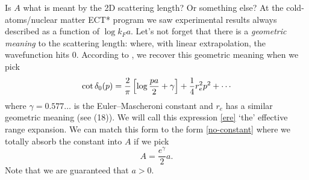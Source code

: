 Is $A$ what is meant by the 2D scattering length?  Or something else?
At the cold-atoms/nuclear matter ECT* program we saw experimental results always described as a function of $\log k_F a$.
Let's not forget that there is a \emph{geometric meaning} to the scattering length: where, with linear extrapolation, the wavefunction hits $0$.
According to , we recover this geometric meaning when we pick
\begin{align}
	\cot \delta_0(p) = \frac{2}{\pi}\left[\log \frac{pa}{2} + \gamma\right] + \frac{1}{4} r_e^2 p^2 + \cdots
	\label{eq:ere}
\end{align}
where $\gamma = 0.577\ldots$ is the Euler–Mascheroni constant and $r_e$ has a similar geometric meaning (see  (18)).
We will call this expression \eqref{ere} `the' effective range expansion.
We can match this form to the form \eqref{no-constant} where we totally absorb the constant into $A$ if we pick
\begin{equation}
	A = \frac{e^{\gamma}}{2} a.
\end{equation}
Note that we are guaranteed that $a>0$.

